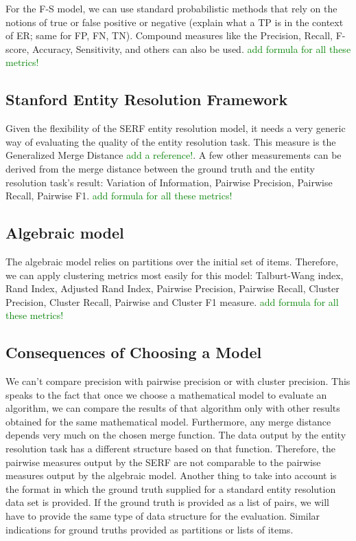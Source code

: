 \documentclass[11pt]{article}
\begin{document}
    For the F-S model, we can use standard probabilistic methods that rely on the notions of true or false positive or negative (explain what a TP is in the context of ER; same for FP, FN, TN). Compound measures like the Precision, Recall, F-score, Accuracy, Sensitivity, and others can also be used. 
    \textcolor{green}{add formula for all these metrics!}


    \subsection[serf]{Stanford Entity Resolution Framework}\label{subsec:stanford-entity-resolution-framework}
    
    Given the flexibility of the SERF entity resolution model, it needs a very generic way of evaluating the quality of the entity resolution task. This measure is the Generalized Merge Distance \textcolor{green}{add a reference!}. A few other measurements can be derived from the merge distance between the ground truth and the entity resolution task's result: Variation of Information, Pairwise Precision, Pairwise Recall, Pairwise F1. 
    \textcolor{green}{add formula for all these metrics!}

    \subsection[algebraic]{Algebraic model}\label{subsec:algebraic-model}

    The algebraic model relies on partitions over the initial set of items. Therefore, we can apply clustering metrics most easily for this model: Talburt-Wang index, Rand Index, Adjusted Rand Index, Pairwise Precision, Pairwise Recall, Cluster Precision, Cluster Recall, Pairwise and Cluster F1 measure.
    \textcolor{green}{add formula for all these metrics!}

    \subsection[why-bother]{Consequences of Choosing a Model}\label{subsec:why-bother}

    We can't compare precision with pairwise precision or with cluster precision. This speaks to the fact that once we choose a mathematical model to evaluate an algorithm, we can compare the results of that algorithm only with other results obtained for the same mathematical model. Furthermore, any merge distance depends very much on the chosen merge function. The data output by the entity resolution task has a different structure based on that function. Therefore, the pairwise measures output by the SERF are not comparable to the pairwise measures output by the algebraic model. Another thing to take into account is the format in which the ground truth supplied for a standard entity resolution data set is provided. If the ground truth is provided as a list of pairs, we will have to provide the same type of data structure for the evaluation. Similar indications for ground truths provided as partitions or lists of items.
\end{document}

